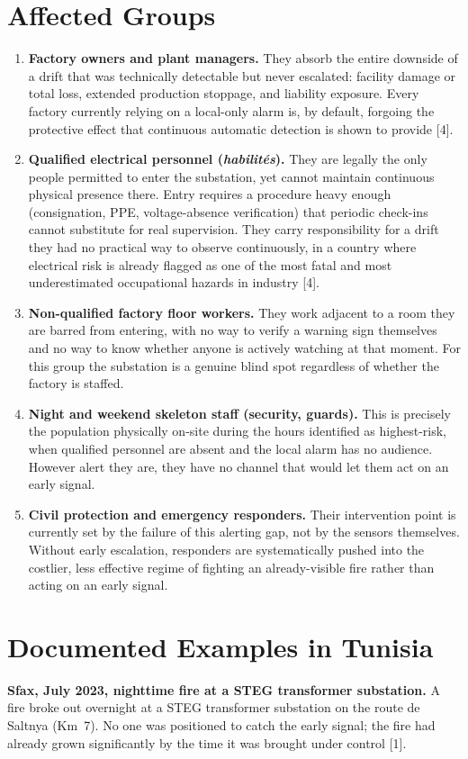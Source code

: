\documentclass[10pt]{article}
\begin{document}
\section{Affected Groups}
\begin{enumerate}[label=\alph*.]
\item \textbf{Factory owners and plant managers.} They absorb the entire downside of a drift that was technically detectable but never escalated: facility damage or total loss, extended production stoppage, and liability exposure. Every factory currently relying on a local-only alarm is, by default, forgoing the protective effect that continuous automatic detection is shown to provide [4].
\item \textbf{Qualified electrical personnel (\emph{habilit\'es}).} They are legally the only people permitted to enter the substation, yet cannot maintain continuous physical presence there. Entry requires a procedure heavy enough (consignation, PPE, voltage-absence verification) that periodic check-ins cannot substitute for real supervision. They carry responsibility for a drift they had no practical way to observe continuously, in a country where electrical risk is already flagged as one of the most fatal and most underestimated occupational hazards in industry [4].
\item \textbf{Non-qualified factory floor workers.} They work adjacent to a room they are barred from entering, with no way to verify a warning sign themselves and no way to know whether anyone is actively watching at that moment. For this group the substation is a genuine blind spot regardless of whether the factory is staffed.
\item \textbf{Night and weekend skeleton staff (security, guards).} This is precisely the population physically on-site during the hours identified as highest-risk, when qualified personnel are absent and the local alarm has no audience. However alert they are, they have no channel that would let them act on an early signal.
\item \textbf{Civil protection and emergency responders.} Their intervention point is currently set by the failure of this alerting gap, not by the sensors themselves. Without early escalation, responders are systematically pushed into the costlier, less effective regime of fighting an already-visible fire rather than acting on an early signal.
\end{enumerate}

\section{Documented Examples in Tunisia}
\textbf{Sfax, July 2023, nighttime fire at a STEG transformer substation.} A fire broke out overnight at a STEG transformer substation on the route de Saltnya (Km~7). No one was positioned to catch the early signal; the fire had already grown significantly by the time it was brought under control [1].
\end{document}
